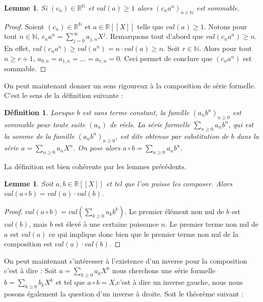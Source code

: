 \documentclass[12pt,a4paper]{amsart}
\newtheorem{lem}[thm]{\bf Lemme}
\newtheorem{defn}[thm]{\bf D\'efinition}
\begin{document}
\begin{lem}
Si $(c_{n})\in \mathbb{R}^{\mathbb{N}}$ et $val(a)\geq 1$ alors $(c_{n}a^{n})_{n\in \mathbb{N}}$ est sommable. 

\end{lem}

\begin{proof}
Soient $(c_{n}) \in \mathbb{R}^{\mathbb{N}}$ et $ a \in \mathbb{R}[[X]]$ telle que $ val(a)\geq 1$. Notons pour tout $ n\in \mathbb{N}$, $c_{n}a^{n}=\sum_{j=0}^{\infty}a_{j,n}X^{j}$. Remarquons tout d'abord que $val(c_{n}a^{n}) \geq n$. En effet, $val(c_{n}a^{n})\geq val(a^{n})=n \cdot val(a)\geq n$. Soit $r\in \mathbb{N}$. Alors pour tout $n\geq r+1$, $a_{0,n}=a_{1,n}=...=a_{r,n}=0$. Ceci permet de conclure que $(c_{n}a^{n})$ est sommable. 
\end{proof}

On peut maintenant donner un sens rigoureux à la composition de série formelle. C'est le sens de la définition suivante : 


\begin{defn}
Lorsque $b$ est sans terme constant, la famille $(a_{n}b^{n})_{n \geq 0}$ est sommable pour toute suite $(a_{n})$ de réels. La série formelle $\sum_{n \geq 0} a_{n}b^{n}$, qui est la somme de la famille $(a_{n}b^{n})_{n\geq0}$, est dite obtenue par substitution de $b$ dans la série $a= \sum_{n \geq 0} a_{n}X^{n}$. On pose alors $a\circ b = \sum_{n\geq 0} a_{n}b^{n}$. 
\end{defn}

La définition est bien cohérente par les lemmes précédents.\\

\begin{lem}
Soit $a,b\in \mathbb{R}[[X]]$ et tel que l'on puisse les composer. Alors $val(a \circ b)=val(a)\cdot val(b)$. 
\end{lem}

\begin{proof}
$val(a \circ b)=val\left(\sum_{k\geq 0} a_{k} b^{k}\right)$. Le premier élément non nul de $b$ est $val(b)$, mais $b$ est élevé à une certaine puissance $n$. Le premier terme non nul de $a$ est $val(a)$ ce qui implique donc bien que le premier terme non nul de la composition est $val(a) \cdot val(b)$. 


\end{proof}

On peut maintenant s'intéresser à l'existence d'un inverse pour la composition c'est à dire : Soit $ a = \sum_{k\geq 0} a_{k}X^{k}$ nous cherchons une série formelle $b=\sum_{k\geq0} b_{k}X^{k}$ et tel que $ a \circ b = X $,c'est à dire un inverse gauche, nous nous posons  également la question d'un inverse à droite. Soit le théorème suivant : 
\end{document}
